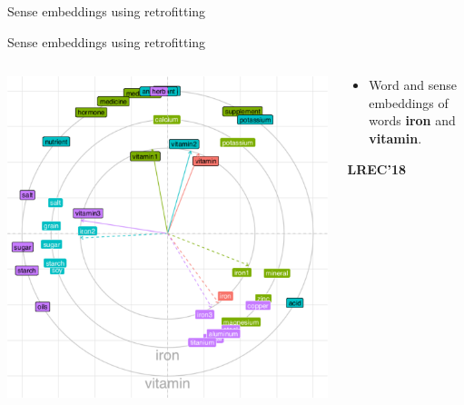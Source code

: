 \begin{frame}{Sense embeddings using retrofitting}
\begin{table}
 \end{table}
%
%

\end{frame}



\begin{frame}{Sense embeddings using retrofitting}
\vspace{-1em}
\begin{columns}
\begin{column}{0.55\textwidth}
\includegraphics[height=0.68\textheight]{bullseye}
\end{column}

\begin{column}{.45\textwidth}
{ \footnotesize

\begin{itemize}

\item Word and sense embeddings of words \textbf{iron} and  \textbf{vitamin}.

\end{itemize}

\textbf{LREC'18}~\cite{remus:2018}

}
\end{column}
\end{columns}

\end{frame}

